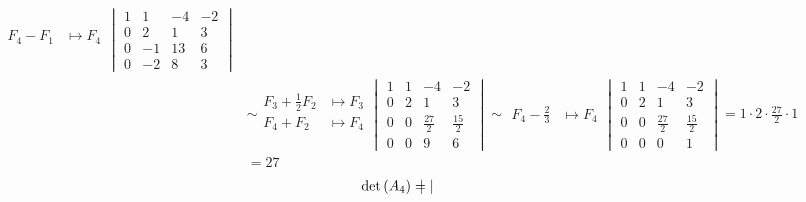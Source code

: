 \begin{enumerate}[label=\listAlph]
\[\begin{aligned}
\begin{aligned}
                        F_4 - F_1 &\mapsto F_4 \\
                    \end{aligned}
                    \begin{vmatrix}
                        1 & 1 & -4 & -2 \\
                        0 & 2 & 1 & 3 \\
                        0 & -1 & 13 & 6 \\
                        0 & -2 & 8 & 3
                    \end{vmatrix}
                    \\
                    &\sim
                    \begin{aligned}
                        F_3 + \frac{1}{2}F_2 &\mapsto F_3 \\
                        F_4 + F_2 &\mapsto F_4 \\
                    \end{aligned}
                    \begin{vmatrix}
                        1 & 1 & -4 & -2 \\
                        0 & 2 & 1 & 3 \\
                        0 & 0 & \frac{27}{2} & \frac{15}{2} \\
                        0 & 0 & 9 & 6
                    \end{vmatrix}
                    \sim
                    \begin{aligned}
                        F_4 - \frac{2}{3} &\mapsto F_4
                    \end{aligned}
                    \begin{vmatrix}
                        1 & 1 & -4 & -2 \\
                        0 & 2 & 1 & 3 \\
                        0 & 0 & \frac{27}{2} & \frac{15}{2} \\
                        0 & 0 & 0 & 1
                    \end{vmatrix}
                    =
                    1 \cdot 2 \cdot \frac{27}{2} \cdot 1
                    \\
                    &= 27
                \end{aligned}
            \]
            \[
                \begin{aligned}
                    \text{det} \left( A_4 \right)
                    &=
                    \begin{vmatrix}

\end{vmatrix}
\end{aligned}\]
\end{enumerate}
